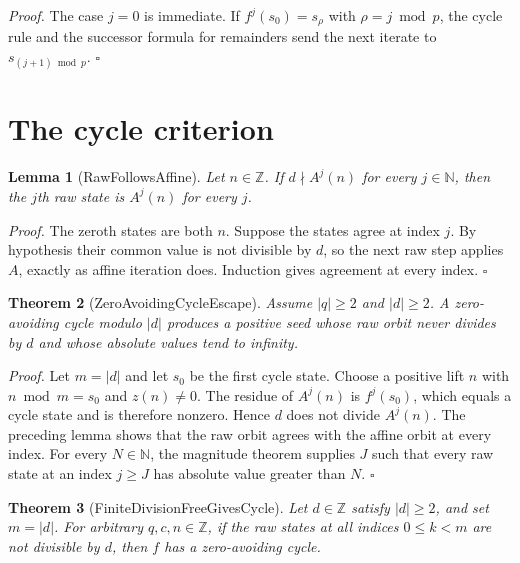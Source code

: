 \documentclass[11pt,letterpaper]{article}
\newcommand{\N}{\mathbb{N}}
\newcommand{\Z}{\mathbb{Z}}
\newtheorem{theorem}{Theorem}
\newtheorem{lemma}[theorem]{Lemma}
\newenvironment{proof}{\noindent\textit{Proof.}}{\hfill\(\square\)}
\begin{document}
\begin{proof}
The case \(j=0\) is immediate. If \(f^{j}(s_0)=s_{\rho}\) with \(\rho=j\bmod p\), the cycle rule and the successor formula for remainders send the next iterate to \(s_{(j+1)\bmod p}\).
\end{proof}

\section{The cycle criterion}

\begin{lemma}[RawFollowsAffine]
Let \(n\in\Z\). If \(d\nmid A^j(n)\) for every \(j\in\N\), then the \(j\)th raw state is \(A^j(n)\) for every \(j\).
\end{lemma}

\begin{proof}
The zeroth states are both \(n\). Suppose the states agree at index \(j\). By hypothesis their common value is not divisible by \(d\), so the next raw step applies \(A\), exactly as affine iteration does. Induction gives agreement at every index.
\end{proof}

\begin{theorem}[ZeroAvoidingCycleEscape]
Assume \(|q|\ge 2\) and \(|d|\ge 2\). A zero-avoiding cycle modulo \(|d|\) produces a positive seed whose raw orbit never divides by \(d\) and whose absolute values tend to infinity.
\end{theorem}

\begin{proof}
Let \(m=|d|\) and let \(s_0\) be the first cycle state. Choose a positive lift \(n\) with \(n\bmod m=s_0\) and \(z(n)\ne 0\). The residue of \(A^{j}(n)\) is \(f^{j}(s_0)\), which equals a cycle state and is therefore nonzero. Hence \(d\) does not divide \(A^{j}(n)\). The preceding lemma shows that the raw orbit agrees with the affine orbit at every index. For every \(N\in\N\), the magnitude theorem supplies \(J\) such that every raw state at an index \(j\ge J\) has absolute value greater than \(N\).
\end{proof}

\begin{theorem}[FiniteDivisionFreeGivesCycle]
Let \(d\in\Z\) satisfy \(|d|\ge 2\), and set \(m=|d|\). For arbitrary \(q,c,n\in\Z\), if the raw states at all indices \(0\le k<m\) are not divisible by \(d\), then \(f\) has a zero-avoiding cycle.
\end{theorem}
\end{document}
